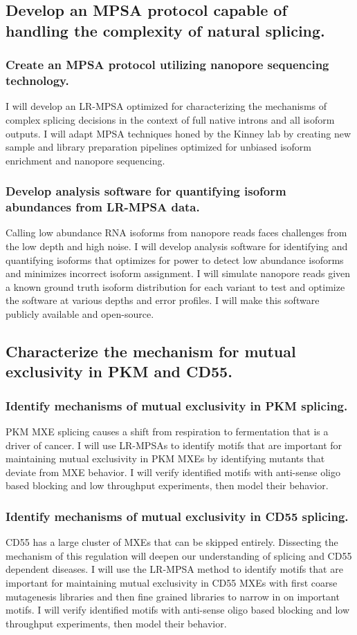 \documentclass[11pt]{article}
\begin{document}
%
\subsection{Develop an MPSA protocol capable of handling the complexity of natural splicing.}
%
\subsubsection{Create an MPSA protocol utilizing nanopore sequencing technology.}
I will develop an LR-MPSA optimized for characterizing the mechanisms of complex splicing decisions in the context of full native introns and all isoform outputs.
I will adapt MPSA techniques honed by the Kinney lab by creating new sample and library preparation pipelines optimized for unbiased isoform enrichment and nanopore sequencing.
%
\subsubsection{Develop analysis software for quantifying isoform abundances from LR-MPSA data.} 
Calling low abundance RNA isoforms from nanopore reads faces challenges from the low depth and high noise.
I will develop analysis software for identifying and quantifying isoforms that optimizes for power to detect low abundance isoforms and minimizes incorrect isoform assignment.
I will simulate nanopore reads given a known ground truth isoform distribution for each variant to test and optimize the software at various depths and error profiles.
I will make this software publicly available and open-source.
%
\subsection{Characterize the mechanism for mutual exclusivity in PKM and CD55.}
%
\subsubsection{Identify mechanisms of mutual exclusivity in PKM splicing.}
PKM MXE splicing causes a shift from respiration to fermentation that is a driver of cancer.
I will use LR-MPSAs to identify motifs that are important for maintaining mutual exclusivity in PKM MXEs by identifying mutants that deviate from MXE behavior.
I will verify identified motifs with anti-sense oligo based blocking and low throughput experiments, then model their behavior.
%
\subsubsection{Identify mechanisms of mutual exclusivity in CD55 splicing.}
CD55 has a large cluster of MXEs that can be skipped entirely.
Dissecting the mechanism of this regulation will deepen our understanding of splicing and CD55 dependent diseases.
I will use the LR-MPSA method to identify motifs that are important for maintaining mutual exclusivity in CD55 MXEs with first coarse mutagenesis libraries and then fine grained libraries to narrow in on important motifs.
I will verify identified motifs with anti-sense oligo based blocking and low throughput experiments, then model their behavior.
%
\end{document}
